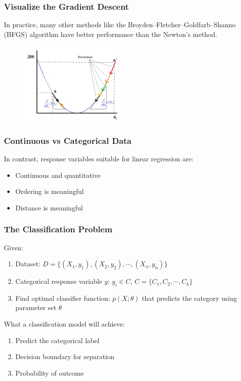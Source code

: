 \documentclass[10pt,aspectratio=169]{beamer}
\begin{document}
      \begin{frame}
        \frametitle{Visualize the Gradient Descent}

        In practice, many other methods like the
        Broyden–Fletcher–Goldfarb–Shanno (BFGS) algorithm have better
        performance than the Newton's method.

        \begin{figure}[t]
          \includegraphics[width=0.5\textwidth]{images/gd-placeholder.jpg}
        \end{figure}
      \end{frame}

      \begin{frame}
        \frametitle{Continuous vs Categorical Data}
        In contrast, response variables suitable for linear regression
        are:
        \begin{itemize}
        \item Continuous and quantitative
        \item Ordering is meaningful
        \item Distance is meaningful
        \end{itemize}

      \end{frame}

      \begin{frame}
        \frametitle{The Classification Problem}

        Given:
        \begin{enumerate}
        \item Dataset:
          $D = \{(X_{1}, y_{1}), (X_{2},y_{2}), \cdots , (X_{n},
          y_{n})\}$
        \item Categorical response variable $y$: $y_{i} \in C$,
          $C = \{C_{1}, C_{2}, \cdots, C_{k}\}$
    
        \item Find optimal classifier function: $p(X; \theta)$ that
          predicts the category using parameter set $\theta$
        \end{enumerate}

        \vspace{2em}

        What a classification model will achieve:
        \begin{enumerate}
        \item Predict the categorical label
        \item Decision boundary for separation
        \item Probability of outcome
        \end{enumerate}
  
      \end{frame}
\end{document}
